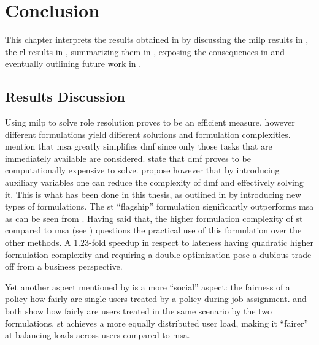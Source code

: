 \chapter{Conclusion}
\label{ch:conclusion}

This chapter interprets the results obtained in  by discussing the \gls{milp} results in , the \gls{rl} results in , summarizing them in , exposing the consequences in  and eventually outlining future work in .

\section{ Results Discussion}
\label{sec:optimization_discussion}

Using \gls{milp} to solve role resolution proves to be an efficient measure, however different formulations yield different solutions and formulation complexities. \citet[p. 15]{Zeng2005} mention that \gls{msa} greatly simplifies \gls{dmf} since only those tasks that are immediately available are considered. \citet{Garey1990} state that \gls{dmf} proves to be computationally expensive to solve. \citet[p. 13]{Zeng2005} propose however that by introducing auxiliary variables one can reduce the complexity of \gls{dmf} and effectively solving it. This is what has been done in this thesis, as outlined in  by introducing new types of formulations. The \gls{st} ``flagship'' formulation significantly outperforms \gls{msa} as can be seen from . Having said that, the higher formulation complexity of \gls{st} compared to \gls{msa} (see ) questions the practical use of this formulation over the other methods. A $1.23$-fold speedup in respect to lateness having quadratic higher formulation complexity and requiring a double optimization pose a dubious trade-off from a business perspective.


Yet another aspect mentioned by \citet[pp. 17--18]{Zeng2005} is a more ``social'' aspect: the fairness of a policy \ie how fairly are single users treated by a policy during job assignment.  and  both show how fairly are users treated in the same scenario by the two formulations. \gls{st} achieves a more equally distributed user load, making it ``fairer'' at balancing loads across users compared to \gls{msa}.

